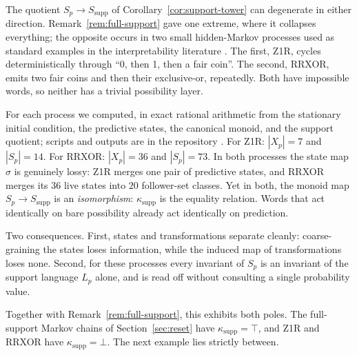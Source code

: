 \documentclass[10pt]{article}
\theoremstyle{definition}
\theoremstyle{remark}
\begin{document}
The quotient $S_p\to S_{\mathrm{supp}}$ of
Corollary~\ref{cor:support-tower} can degenerate in either direction.
Remark~\ref{rem:full-support} gave one extreme, where it collapses
everything; the opposite occurs in two small hidden-Markov processes
used as standard examples in the interpretability literature
\cite{ShaiEtAl2024}.  The first, Z1R, cycles deterministically through
``0, then 1, then a fair coin''.  The second, RRXOR, emits two fair
coins and then their exclusive-or, repeatedly.  Both have impossible
words, so neither has a trivial possibility layer.

For each process we computed, in exact rational arithmetic from the
stationary initial condition, the predictive states, the canonical
monoid, and the support quotient; scripts and outputs are in the
repository \cite{DovetailRepo}.  For Z1R: $|X_p|=7$ and $|S_p|=14$.
For RRXOR: $|X_p|=36$ and $|S_p|=73$.  In both processes the
state map $\sigma$ is genuinely lossy: Z1R merges one pair of
predictive states, and RRXOR merges its $36$ live states into $20$
follower-set classes.  Yet in both, the monoid map
$S_p\to S_{\mathrm{supp}}$ is an \emph{isomorphism}:
$\kappa_{\mathrm{supp}}$ is the equality relation.  Words that act
identically on bare possibility already act identically on prediction.

Two consequences.  First, states and transformations separate cleanly:
coarse-graining the states loses information, while the induced map
of transformations loses none.  Second, for these processes every
invariant of $S_p$ is an invariant of the support language $L_p$
alone, and is read off without consulting a single probability value.

Together with Remark~\ref{rem:full-support}, this exhibits both poles.
The full-support Markov chains of Section~\ref{sec:reset} have
$\kappa_{\mathrm{supp}}=\top$, and Z1R and RRXOR have
$\kappa_{\mathrm{supp}}=\bot$.  The next example lies strictly
between.
\end{document}
